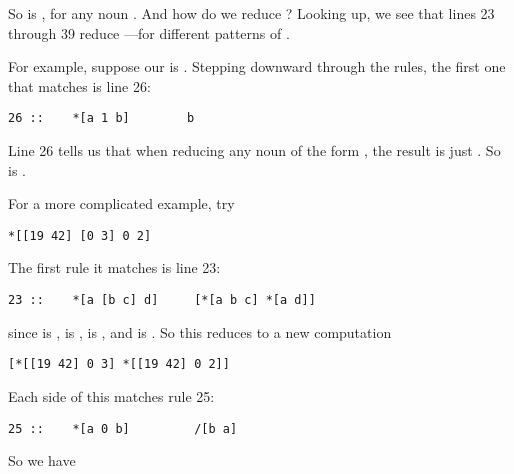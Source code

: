 So  is , for any noun .  And how do we reduce
?  Looking up, we see that lines 23 through 39 reduce ---for different patterns of .

For example, suppose our  is \kode{[5 1 6]}.  Stepping downward
through the rules, the first one that matches is line 26:

\begin{framed_shaded}
\begin{Verbatim}[fontsize=\relsize{-2.5},fontseries=b,commandchars=\\\{\}]
26 ::    *[a 1 b]        b
\end{Verbatim}
\end{framed_shaded}
Line 26 tells us that when reducing any noun of the form \kode{[a 1
b]}, the result is just .  So \kode{*[5 1 6]} is .

For a more complicated example, try

\begin{framed_shaded}
\begin{Verbatim}[fontsize=\relsize{-2.5},fontseries=b,commandchars=\\\{\}]
*[[19 42] [0 3] 0 2]
\end{Verbatim}
\end{framed_shaded}
The first rule it matches is line 23:

\begin{framed_shaded}
\begin{Verbatim}[fontsize=\relsize{-2.5},fontseries=b,commandchars=\\\{\}]
23 ::    *[a [b c] d]     [*[a b c] *[a d]]
\end{Verbatim}
\end{framed_shaded}
since  is \kode{[19 42]},  is ,  is , and  is \kode{[0 2]}.
So this reduces to a new computation

\begin{framed_shaded}
\begin{Verbatim}[fontsize=\relsize{-2.5},fontseries=b,commandchars=\\\{\}]
[*[[19 42] 0 3] *[[19 42] 0 2]]
\end{Verbatim}
\end{framed_shaded}
Each side of this matches rule 25:

\begin{framed_shaded}
\begin{Verbatim}[fontsize=\relsize{-2.5},fontseries=b,commandchars=\\\{\}]
25 ::    *[a 0 b]         /[b a]
\end{Verbatim}
\end{framed_shaded}
So we have

